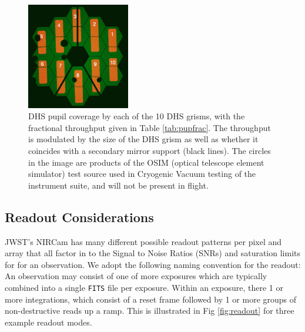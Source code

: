 \documentclass{emulateapj}
\begin{document}
\begin{figure}
\centering
\includegraphics[width=0.4\textwidth]{dhs_pupil_overlay.png}
\caption{DHS pupil coverage by each of the 10 DHS grisms, with the fractional throughput given in Table \ref{tab:pupfrac}. The throughput is modulated by the size of the DHS grism as well as whether it coincides with a secondary mirror support (black lines). The circles in the image are products of the OSIM (optical telescope element simulator) test source used in Cryogenic Vacuum testing of the instrument suite, and will not be present in flight.}\label{fig:DHSvsPupilOverlay}

\end{figure}
\subsection{Readout Considerations}\label{sec:readout}
JWST's NIRCam has many different possible readout patterns per pixel and array that all factor in to the Signal to Noise Ratios (SNRs) and saturation limits for for an observation. We adopt the following naming convention for the readout: An observation may consist of one of more exposures which are typically combined into a single \texttt{FITS} file per exposure. Within an exposure, there 1 or more integrations, which consist of a reset frame followed by 1 or more groups of non-destructive reads up a ramp. This is illustrated in Fig \ref{fig:readout} for three example readout modes.
\end{document}
